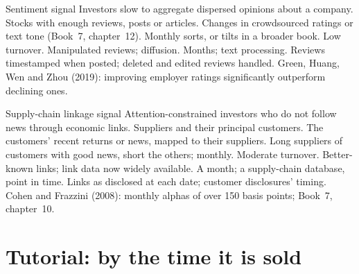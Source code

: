 \begin{strategyfile}{Sentiment signal}\label{strat:s1:alternative-data-strategies:sentiment}
 Investors slow to aggregate dispersed opinions about a company.
 Stocks with enough reviews, posts or articles.
 Changes in crowdsourced ratings or text tone (Book~7, chapter~12).
 Monthly sorts, or tilts in a broader book.
 Low turnover.
 Manipulated reviews; diffusion.
 Months; text processing.
 Reviews timestamped when posted; deleted and edited reviews handled.
 Green, Huang, Wen and Zhou (2019): improving employer ratings significantly outperform declining ones.
\end{strategyfile}

\begin{strategyfile}{Supply-chain linkage signal}\label{strat:s1:alternative-data-strategies:supply}
 Attention-constrained investors who do not follow news through economic links.
 Suppliers and their principal customers.
 The customers' recent returns or news, mapped to their suppliers.
 Long suppliers of customers with good news, short the others; monthly.
 Moderate turnover.
 Better-known links; link data now widely available.
 A month; a supply-chain database, point in time.
 Links as disclosed at each date; customer disclosures' timing.
 Cohen and Frazzini (2008): monthly alphas of over 150 basis points; Book~7, chapter~10.
\end{strategyfile}

\section{Tutorial: by the time it is sold}\label{tut:s1:alternative-data-strategies:tut}


